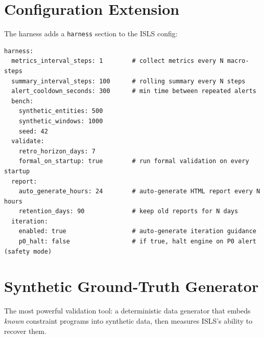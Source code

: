 \documentclass[10pt,a4paper]{article}
\begin{document}
\section{Configuration Extension}
\label{sec:config}

The harness adds a \texttt{harness} section to the ISLS config:

\begin{lstlisting}[style=yaml]
harness:
  metrics_interval_steps: 1        # collect metrics every N macro-steps
  summary_interval_steps: 100      # rolling summary every N steps
  alert_cooldown_seconds: 300      # min time between repeated alerts
  bench:
    synthetic_entities: 500
    synthetic_windows: 1000
    seed: 42
  validate:
    retro_horizon_days: 7
    formal_on_startup: true        # run formal validation on every startup
  report:
    auto_generate_hours: 24        # auto-generate HTML report every N hours
    retention_days: 90             # keep old reports for N days
  iteration:
    enabled: true                  # auto-generate iteration guidance
    p0_halt: false                 # if true, halt engine on P0 alert (safety mode)
\end{lstlisting}

\section{Synthetic Ground-Truth Generator}
\label{sec:synthetic}

The most powerful validation tool: a deterministic data generator that embeds \emph{known} constraint programs into synthetic data, then measures ISLS's ability to recover them.
\end{document}

